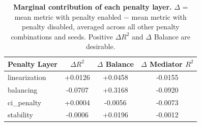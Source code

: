 \begin{table}[ht]
\centering
\caption{\textbf{Marginal contribution of each penalty layer.}
$\Delta$ = mean metric with penalty enabled $-$ mean metric with penalty disabled,
averaged across all other penalty combinations and seeds.
Positive $\Delta R^2$ and $\Delta$ Balance are desirable.}
\label{tab:ablation_marginal}
\begin{tabular}{lccc}
\toprule
Penalty Layer & $\Delta R^2$ & $\Delta$ Balance & $\Delta$ Mediator $R^2$ \\
\midrule
linearization & +0.0126 & +0.0458 & -0.0155 \\
balancing & -0.0707 & +0.3168 & -0.0920 \\
ci\_penalty & +0.0004 & -0.0056 & -0.0073 \\
stability & -0.0006 & +0.0196 & -0.0012 \\
\bottomrule
\end{tabular}
\end{table}
